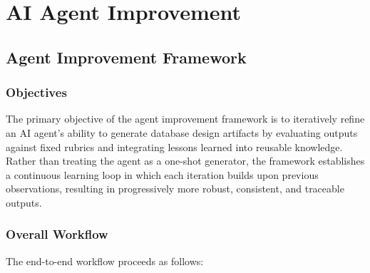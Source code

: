 
\section{AI Agent Improvement}


\subsection{Agent Improvement Framework}

\subsubsection{Objectives}

The primary objective of the agent improvement framework is to iteratively refine an AI agent's ability to generate database design artifacts by evaluating outputs against fixed rubrics and integrating lessons learned into reusable knowledge. Rather than treating the agent as a one-shot generator, the framework establishes a continuous learning loop in which each iteration builds upon previous observations, resulting in progressively more robust, consistent, and traceable outputs.

\subsubsection{Overall Workflow}

The end-to-end workflow proceeds as follows:

